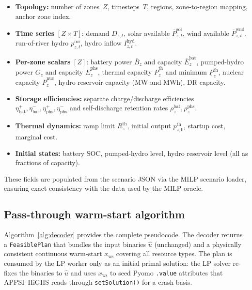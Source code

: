 \documentclass{article}
\begin{document}
\begin{itemize}[noitemsep]
  \item \textbf{Topology:} number of zones~$Z$, timesteps~$T$, regions, zone-to-region mapping, anchor zone index.
  \item \textbf{Time series} $[Z \times T]$: demand $D_{z,t}$, solar available $\overline{P}^{\mathrm{sol}}_{z,t}$, wind available $\overline{P}^{\mathrm{wnd}}_{z,t}$, run-of-river hydro $p^{\mathrm{ror}}_{z,t}$, hydro inflow $I^{\mathrm{hyd}}_{z,t}$.
  \item \textbf{Per-zone scalars} $[Z]$: battery power $\overline{B}_z$ and capacity $\overline{E}^{\mathrm{bat}}_z$, pumped-hydro power $\overline{G}_z$ and capacity $\overline{E}^{\mathrm{phs}}_z$, thermal capacity $\overline{P}^{\mathrm{th}}_z$ and minimum $\underline{P}^{\mathrm{th}}_z$, nuclear capacity $\overline{P}^{\mathrm{nuc}}_z$, hydro reservoir capacity (MW and MWh), DR capacity.
  \item \textbf{Storage efficiencies:} separate charge/discharge efficiencies $\eta^+_{\mathrm{bat}}, \eta^-_{\mathrm{bat}}, \eta^+_{\mathrm{phs}}, \eta^-_{\mathrm{phs}}$ and self-discharge retention rates $\rho^{\mathrm{bat}}_z, \rho^{\mathrm{phs}}_z$.
  \item \textbf{Thermal dynamics:} ramp limit $R^{\mathrm{th}}_z$, initial output $p^{\mathrm{th}}_{z,0}$, startup cost, marginal cost.
  \item \textbf{Initial states:} battery SOC, pumped-hydro level, hydro reservoir level (all as fractions of capacity).
\end{itemize}

These fields are populated from the scenario JSON via the MILP scenario loader, ensuring exact consistency with the data used by the MILP oracle.

\subsection{Pass-through warm-start algorithm}

Algorithm~\ref{alg:decoder} provides the complete pseudocode. The decoder returns a \texttt{FeasiblePlan} that bundles the input binaries $\hat{u}$ (unchanged) and a physically consistent continuous warm-start $x_{\mathrm{ws}}$ covering all resource types. The plan is consumed by the LP worker only as an initial primal solution: the LP solver re-fixes the binaries to $\hat{u}$ and uses $x_{\mathrm{ws}}$ to seed Pyomo \texttt{.value} attributes that APPSI--HiGHS reads through \texttt{setSolution()} for a crash basis.
\end{document}
